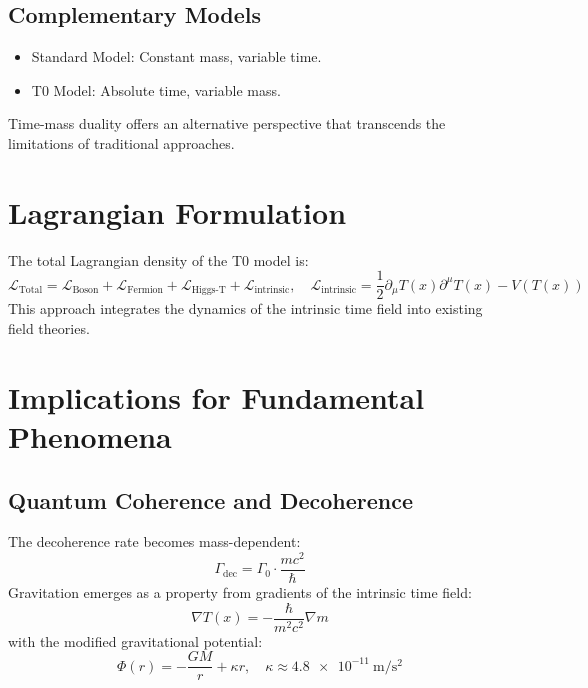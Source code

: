 \documentclass[12pt,a4paper]{article}
\newcommand{\Tfield}{T(x)}
\begin{document}
	\subsection{Complementary Models}
	\begin{itemize}
		\item Standard Model: Constant mass, variable time.
		\item T0 Model: Absolute time, variable mass.
	\end{itemize}
	Time-mass duality offers an alternative perspective that transcends the limitations of traditional approaches.
	
	\section{Lagrangian Formulation}
	The total Lagrangian density of the T0 model is:
	\begin{equation}
		\mathcal{L}_{\text{Total}} = \mathcal{L}_{\text{Boson}} + \mathcal{L}_{\text{Fermion}} + \mathcal{L}_{\text{Higgs-T}} + \mathcal{L}_{\text{intrinsic}}, \quad \mathcal{L}_{\text{intrinsic}} = \frac{1}{2} \partial_\mu \Tfield \partial^\mu \Tfield - V(\Tfield)
	\end{equation}
	This approach integrates the dynamics of the intrinsic time field into existing field theories.
	
	\section{Implications for Fundamental Phenomena}
	\subsection{Quantum Coherence and Decoherence}
	The decoherence rate becomes mass-dependent:
	\begin{equation}
		\Gamma_{\text{dec}} = \Gamma_0 \cdot \frac{m c^2}{\hbar}
	\end{equation}
	Gravitation emerges as a property from gradients of the intrinsic time field:
	\begin{equation}
		\nabla \Tfield = -\frac{\hbar}{m^2 c^2} \nabla m
	\end{equation}
	with the modified gravitational potential:
	\begin{equation}
		\Phi(r) = -\frac{G M}{r} + \kappa r, \quad \kappa \approx \SI{4.8e-11}{\meter\per\second\squared}
	\end{equation}
	
\end{document}
